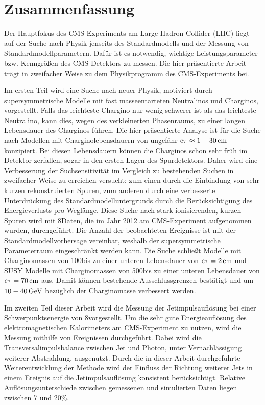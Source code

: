 \chapter*{Zusammenfassung}
Der Hauptfokus des CMS-Experiments am Large Hadron Collider (LHC) liegt auf der Suche nach Physik jenseits des Standardmodells und der Messung von Standardmodellparametern.
Daf\"{u}r ist es notwendig, wichtige Leistungsparameter bzw. Kenngr\"{o}{\ss}en des CMS-Detektors zu messen.
Die hier pr\"{a}sentierte Arbeit tr\"{a}gt in zweifacher Weise zu dem Physikprogramm des CMS-Experiments bei.

Im ersten Teil wird eine Suche nach neuer Physik, motiviert durch supersymmetrische Modelle mit fast masseentarteten Neutralinos und Charginos, vorgestellt.
Falls das leichteste Chargino nur wenig schwerer ist als das leichteste Neutralino, kann dies, wegen des verkleinerten Phasenraums, zu einer langen Lebensdauer des Charginos f\"{u}hren.
Die hier pr\"{a}sentierte Analyse ist f\"{u}r die Suche nach Modellen mit Charginolebensdauern von ungef\"{a}hr $\text{c}\tau\approx 1-30\,\text{cm}$ konzipiert.
Bei diesen Lebensdauern k\"{o}nnen die Charginos schon sehr fr\"{u}h im Detektor zerfallen, sogar in den ersten Lagen des Spurdetektors.
Daher wird eine Verbesserung der Suchsensitivit\"{a}t im Vergleich zu bestehenden Suchen in zweifacher Weise zu erreichen versucht:
zum einen durch die Einbindung von sehr kurzen rekonstruierten Spuren, zum anderen durch eine verbesserte Unterdr\"{u}ckung des Standardmodelluntergrunds durch die Ber\"{u}cksichtigung des Energieverlusts pro Wegl\"{a}nge.
Diese Suche nach stark ionisierenden, kurzen Spuren wird mit 8\tev Daten, die im Jahr 2012 am CMS-Experiment aufgenommen wurden, durchgef\"{u}hrt.
Die Anzahl der beobachteten Ereignisse ist mit der Standardmodellvorhersage vereinbar, weshalb der supersymmetrische Parameterraum eingeschr\"{a}nkt werden kann.
Die Suche schlie{\ss}t Modelle mit Charginomassen von 100\gev bis zu einer unteren Lebensdauer von $\text{c}\tau=2\,\text{cm}$ und SUSY Modelle mit Charginomassen von 500\gev bis zu einer unteren Lebensdauer von $\text{c}\tau=70\,\text{cm}$ aus.
Damit k\"{o}nnen bestehende Ausschlussgrenzen best\"{a}tigt und um $10-40\,\text{Ge}\kern-0.06667em\text{V}$ bez\"{u}glich der Charginomasse verbessert werden.

Im zweiten Teil dieser Arbeit wird die Messung der Jetimpulsaufl\"{o}sung bei einer Schwerpunktsenergie von 8\tev vorgestellt.
Um die sehr gute Energieaufl\"{o}sung des elektromagnetischen Kalorimeters am CMS-Experiment zu nutzen, wird die Messung mithilfe von \GAMJET Ereignissen durchgef\"{u}hrt.
Dabei wird die Transversalimpulsbalance zwischen Jet und Photon, unter Vernachl\"{a}ssigung weiterer Abstrahlung, ausgenutzt.
Durch die in dieser Arbeit durchgef\"{u}hrte Weiterentwicklung der Methode wird der Einfluss der Richtung weiterer Jets in einem Ereignis auf die Jetimpulsaufl\"{o}sung konsistent ber\"{u}cksichtigt.
Relative Aufl\"{o}sungsunterschiede zwischen gemessenen und simulierten Daten liegen zwischen 7 und 20\%.

\cleardoublepage
